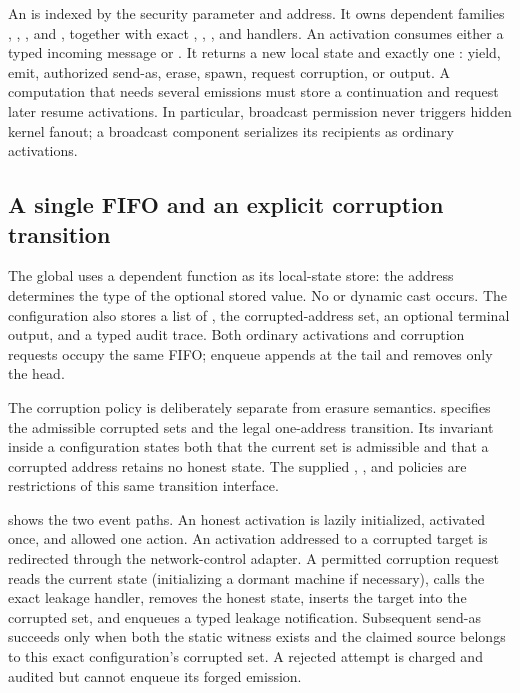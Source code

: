 An  is indexed by the security parameter and address.  It owns
dependent families , , , and
, together with exact , ,
, and  handlers.  An activation consumes either
a typed incoming message or .  It returns a new local state and
exactly one : yield, emit, authorized send-as, erase, spawn,
request corruption, or output.  A computation that needs several emissions
must store a continuation and request later resume activations.  In
particular, broadcast permission never triggers hidden kernel fanout; a
broadcast component serializes its recipients as ordinary activations.

\subsection{A single FIFO and an explicit corruption transition}

The global  uses a dependent function as its local-state
store: the address determines the type of the optional stored value.  No
 or dynamic cast occurs.  The configuration also stores a list of
, the corrupted-address set, an optional terminal output,
and a typed audit trace.  Both ordinary activations and corruption requests
occupy the same FIFO; enqueue appends at the tail and 
removes only the head.

The corruption policy is deliberately separate from erasure semantics.
 specifies the admissible corrupted sets and the legal
one-address transition.  Its invariant inside a configuration states both
that the current set is admissible and that a corrupted address retains no
honest state.  The supplied , , and
 policies are restrictions of this same transition interface.

 shows the two event paths.  An honest activation
is lazily initialized, activated once, and allowed one action.  An activation
addressed to a corrupted target is redirected through the network-control
adapter.  A permitted corruption request reads the current state (initializing
a dormant machine if necessary), calls the exact leakage handler, removes the
honest state, inserts the target into the corrupted set, and enqueues a typed
leakage notification.  Subsequent send-as succeeds only when both the static
 witness exists and the claimed source belongs to this exact
configuration's corrupted set.  A rejected attempt is charged and audited but
cannot enqueue its forged emission.

